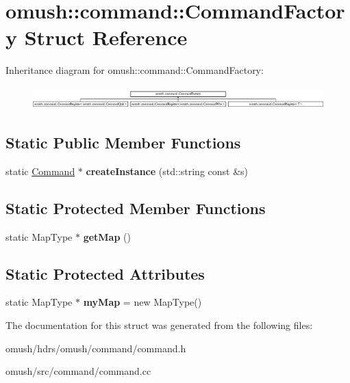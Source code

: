 \hypertarget{structomush_1_1command_1_1_command_factory}{\section{omush\-:\-:command\-:\-:Command\-Factory Struct Reference}
\label{structomush_1_1command_1_1_command_factory}
}
Inheritance diagram for omush\-:\-:command\-:\-:Command\-Factory\-:\begin{figure}[H]
\begin{center}
\leavevmode
\includegraphics[height=0.874317cm]{structomush_1_1command_1_1_command_factory}
\end{center}
\end{figure}
\subsection*{Static Public Member Functions}
\begin{DoxyCompactItemize}
\item 
\hypertarget{structomush_1_1command_1_1_command_factory_a6f14de7234ccbb3b14e305220315d16f}{static \hyperlink{classomush_1_1command_1_1_command}{Command} $\ast$ {\bfseries create\-Instance} (std\-::string const \&s)}\label{structomush_1_1command_1_1_command_factory_a6f14de7234ccbb3b14e305220315d16f}

\end{DoxyCompactItemize}
\subsection*{Static Protected Member Functions}
\begin{DoxyCompactItemize}
\item 
\hypertarget{structomush_1_1command_1_1_command_factory_a5539fa99d7415b471639e60e59ba75be}{static Map\-Type $\ast$ {\bfseries get\-Map} ()}\label{structomush_1_1command_1_1_command_factory_a5539fa99d7415b471639e60e59ba75be}

\end{DoxyCompactItemize}
\subsection*{Static Protected Attributes}
\begin{DoxyCompactItemize}
\item 
\hypertarget{structomush_1_1command_1_1_command_factory_a77ff7608c7f5971a6dee99a3374cc148}{static Map\-Type $\ast$ {\bfseries my\-Map} = new Map\-Type()}\label{structomush_1_1command_1_1_command_factory_a77ff7608c7f5971a6dee99a3374cc148}

\end{DoxyCompactItemize}


The documentation for this struct was generated from the following files\-:\begin{DoxyCompactItemize}
\item 
omush/hdrs/omush/command/command.\-h\item 
omush/src/command/command.\-cc\end{DoxyCompactItemize}

